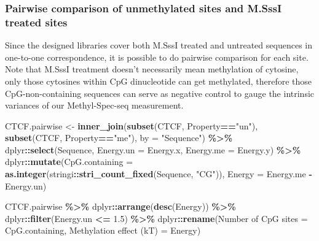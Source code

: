 \documentclass[
]{article}
\newenvironment{Shaded}{\begin{snugshade}}{\end{snugshade}}
\newcommand{\DataTypeTok}[1]{\textcolor[rgb]{0.13,0.29,0.53}{#1}}
\newcommand{\FloatTok}[1]{\textcolor[rgb]{0.00,0.00,0.81}{#1}}
\newcommand{\KeywordTok}[1]{\textcolor[rgb]{0.13,0.29,0.53}{\textbf{#1}}}
\newcommand{\NormalTok}[1]{#1}
\newcommand{\OperatorTok}[1]{\textcolor[rgb]{0.81,0.36,0.00}{\textbf{#1}}}
\newcommand{\StringTok}[1]{\textcolor[rgb]{0.31,0.60,0.02}{#1}}
\begin{document}
\hypertarget{pairwise-comparison-of-unmethylated-sites-and-m.sssi-treated-sites}{%
\subsubsection{Pairwise comparison of unmethylated sites and M.SssI
treated
sites}\label{pairwise-comparison-of-unmethylated-sites-and-m.sssi-treated-sites}}

Since the designed libraries cover both M.SssI treated and untreated
sequences in one-to-one correspondence, it is possible to do pairwise
comparison for each site. Note that M.SssI treatment doesn't necessarily
mean methylation of cytosine, only those cytosines within CpG
dinucleotide can get methylated, therefore those CpG-non-containing
sequences can serve as negative control to gauge the intrinsic variances
of our Methyl-Spec-seq measurement.

\begin{Shaded}
\begin{Highlighting}[]
\NormalTok{CTCF.pairwise \textless{}{-}}\StringTok{ }\KeywordTok{inner\_join}\NormalTok{(}\KeywordTok{subset}\NormalTok{(CTCF, Property}\OperatorTok{==}\StringTok{"un"}\NormalTok{),}
                            \KeywordTok{subset}\NormalTok{(CTCF, Property}\OperatorTok{==}\StringTok{"me"}\NormalTok{), }\DataTypeTok{by =} \StringTok{"Sequence"}\NormalTok{) }\OperatorTok{\%\textgreater{}\%}
\StringTok{  }\NormalTok{dplyr}\OperatorTok{::}\KeywordTok{select}\NormalTok{(Sequence,}
                \DataTypeTok{Energy.un =} \StringTok{\textasciigrave{}}\DataTypeTok{Energy.x}\StringTok{\textasciigrave{}}\NormalTok{,}
                \DataTypeTok{Energy.me =} \StringTok{\textasciigrave{}}\DataTypeTok{Energy.y}\StringTok{\textasciigrave{}}\NormalTok{) }\OperatorTok{\%\textgreater{}\%}
\StringTok{  }\NormalTok{dplyr}\OperatorTok{::}\KeywordTok{mutate}\NormalTok{(}\DataTypeTok{CpG.containing =} \KeywordTok{as.integer}\NormalTok{(stringi}\OperatorTok{::}\KeywordTok{stri\_count\_fixed}\NormalTok{(Sequence, }\StringTok{"CG"}\NormalTok{)),}
                \DataTypeTok{Energy =}\NormalTok{ Energy.me }\OperatorTok{{-}}\StringTok{ }\NormalTok{Energy.un)}

\NormalTok{CTCF.pairwise }\OperatorTok{\%\textgreater{}\%}
\StringTok{  }\NormalTok{dplyr}\OperatorTok{::}\KeywordTok{arrange}\NormalTok{(}\KeywordTok{desc}\NormalTok{(Energy)) }\OperatorTok{\%\textgreater{}\%}
\StringTok{  }\NormalTok{dplyr}\OperatorTok{::}\KeywordTok{filter}\NormalTok{(Energy.un }\OperatorTok{\textless{}=}\StringTok{ }\FloatTok{1.5}\NormalTok{) }\OperatorTok{\%\textgreater{}\%}
\StringTok{  }\NormalTok{dplyr}\OperatorTok{::}\KeywordTok{rename}\NormalTok{(}\StringTok{\textasciigrave{}}\DataTypeTok{Number of CpG sites}\StringTok{\textasciigrave{}}\NormalTok{ =}\StringTok{ }\NormalTok{CpG.containing,}
                \StringTok{\textasciigrave{}}\DataTypeTok{Methylation effect (kT)}\StringTok{\textasciigrave{}}\NormalTok{ =}\StringTok{ }\NormalTok{Energy)}
\end{Highlighting}
\end{Shaded}
\end{document}
